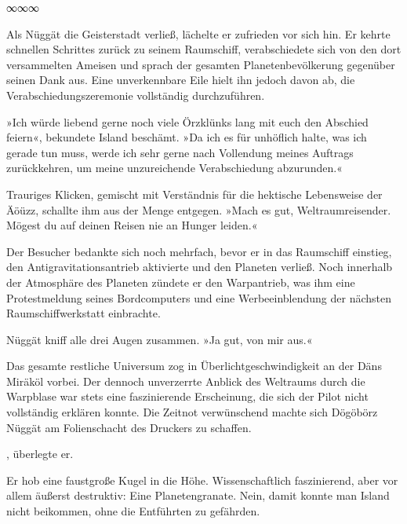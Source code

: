 \begin{center}
∞∞∞
\end{center}

Als Nüggät die Geisterstadt verließ, lächelte er zufrieden vor sich hin. Er kehrte schnellen Schrittes zurück zu seinem Raumschiff, verabschiedete sich von den dort versammelten Ameisen und sprach der gesamten Planetenbevölkerung gegenüber seinen Dank aus. Eine unverkennbare Eile hielt ihn jedoch davon ab, die Verabschiedungszeremonie vollständig durchzuführen.

»Ich würde liebend gerne noch viele Örzklünks lang mit euch den Abschied feiern«, bekundete Island beschämt. »Da ich es für unhöflich halte, was ich gerade tun muss, werde ich sehr gerne nach Vollendung meines Auftrags zurückkehren, um meine unzureichende Verabschiedung abzurunden.«

Trauriges Klicken, gemischt mit Verständnis für die hektische Lebensweise der Äöüzz, schallte ihm aus der Menge entgegen. »Mach es gut, Weltraumreisender. Mögest du auf deinen Reisen nie an Hunger leiden.«

Der Besucher bedankte sich noch mehrfach, bevor er in das Raumschiff einstieg, den Antigravitationsantrieb aktivierte und den Planeten verließ. Noch innerhalb der Atmosphäre des Planeten zündete er den Warpantrieb, was ihm eine Protestmeldung seines Bordcomputers und eine Werbeeinblendung der nächsten Raumschiffwerkstatt einbrachte.


Nüggät kniff alle drei Augen zusammen. »Ja gut, von mir aus.«

Das gesamte restliche Universum zog in Überlichtgeschwindigkeit an der Däns Miräköl vorbei. Der dennoch unverzerrte Anblick des Weltraums durch die Warpblase war stets eine faszinierende Erscheinung, die sich der Pilot nicht vollständig erklären konnte. Die Zeitnot verwünschend machte sich Dögöbörz Nüggät am Folienschacht des Druckers zu schaffen.

, überlegte er. 

Er hob eine faustgroße Kugel in die Höhe. Wissenschaftlich faszinierend, aber vor allem äußerst destruktiv: Eine Planetengranate. Nein, damit konnte man Island nicht beikommen, ohne die Entführten zu gefährden.


